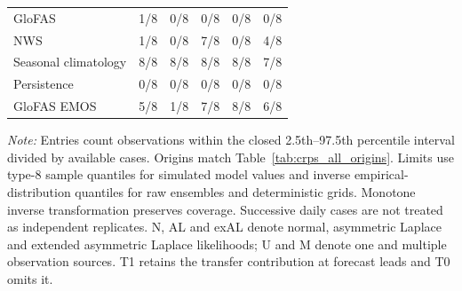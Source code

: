 \begin{table}[!htbp]
\begin{threeparttable}
\begin{tabular}{lrrrrr}
GloFAS & 1/8 & 0/8 & 0/8 & 0/8 & 0/8 \\
NWS & 1/8 & 0/8 & 7/8 & 0/8 & 4/8 \\
Seasonal climatology & 8/8 & 8/8 & 8/8 & 8/8 & 7/8 \\
Persistence & 0/8 & 0/8 & 0/8 & 0/8 & 0/8 \\
GloFAS EMOS & 5/8 & 1/8 & 7/8 & 8/8 & 6/8 \\
\hline
\end{tabular}
\begin{tablenotes}\footnotesize
\item \textit{Note:} Entries count observations within the closed 2.5th--97.5th percentile interval divided by available cases. Origins match Table~\ref{tab:crps_all_origins}. Limits use type-8 sample quantiles for simulated model values and inverse empirical-distribution quantiles for raw ensembles and deterministic grids. Monotone inverse transformation preserves coverage. Successive daily cases are not treated as independent replicates. N, AL and exAL denote normal, asymmetric Laplace and extended asymmetric Laplace likelihoods; U and M denote one and multiple observation sources. T1 retains the transfer contribution at forecast leads and T0 omits it.
\end{tablenotes}
\end{threeparttable}
\end{table}
